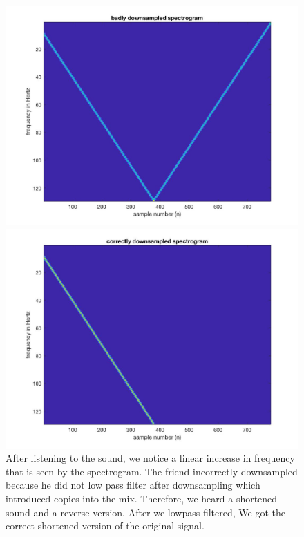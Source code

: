 \documentclass{article}
\begin{document}
\begin{figure}[H]
\includegraphics[scale=.5]{Blackdog2}
\includegraphics[scale=.5]{Blackdog3}
After listening to the sound, we notice a linear increase in frequency that is seen by the spectrogram. The friend incorrectly downsampled because he did not low pass filter after downsampling which introduced copies into the mix.
Therefore, we heard a shortened sound and a reverse version. After we lowpass filtered, We got the correct shortened version of the original signal.
\end{figure}
\end{document}
